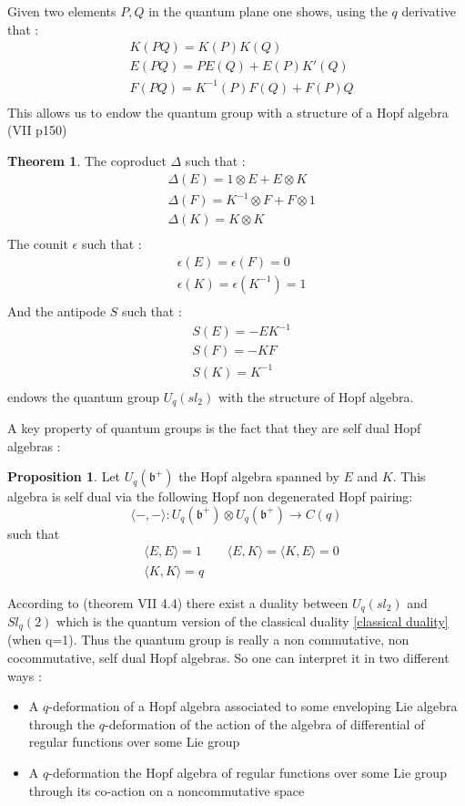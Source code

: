 \documentclass{article}
\theoremstyle{definition}
\newtheorem{theo}{Theorem}[section]
\newtheorem{Prop}{Proposition}[section]
\begin{document}
Given two elements $P,Q$ in the quantum plane one shows, using the $q$ derivative that : \begin{align}
&K(PQ)=K(P)K(Q)\\
&E(PQ)=PE(Q)+E(P)K'(Q)\\
&F(PQ)=K^{-1}(P)F(Q)+F(P)Q\\
\end{align}
This allows us to endow the quantum group with a structure of a Hopf algebra\cite{Kassel} (VII p150)
\begin{theo} The coproduct $\Delta$ such that :\begin{align*}
&\Delta(E)=1\otimes E+E\otimes K\\
&\Delta(F)=K^{-1}\otimes F+F\otimes 1\\
&\Delta(K)=K\otimes K\\
\end{align*}
The counit $\epsilon$ such that :\begin{align*}
&\epsilon(E)=\epsilon(F)=0\\
&\epsilon(K)=\epsilon(K^{-1})=1\\
\end{align*}
And the antipode $S$ such that : \begin{align*}
&S(E)=-EK^{-1}\\
&S(F)=-KF\\
&S(K)=K^{-1}\\
\end{align*}
endows the quantum group $U_q(sl_2)$ with the structure of Hopf algebra.
\end{theo}
A key property of quantum groups is the fact that they are self dual Hopf algebras : \begin{Prop}Let $U_q(\mathfrak{b}^+)$ the Hopf algebra spanned by $E$ and $K$. This algebra is self dual  via the following Hopf non degenerated Hopf pairing: $$\langle-,-\rangle : U_q(\mathfrak{b}^+)\otimes U_q(\mathfrak{b}^+)\to C(q)$$ such that \begin{align*}
&\langle E,E\rangle = 1\qquad \langle E, K\rangle =\langle K,E\rangle =0 \\
&\langle K,K\rangle = q
\end{align*}
\end{Prop}
According to \cite{Kassel} (theorem VII 4.4) there exist a duality between $U_q(sl_2)$ and $Sl_q(2)$ which is the quantum version of the classical duality \ref{classical duality} (when q=1). Thus the quantum group is really a non commutative, non cocommutative, self dual Hopf algebras. So one can interpret it in two different ways : \begin{itemize}
\item A $q$-deformation of a Hopf algebra associated to some enveloping Lie algebra through the $q$-deformation of the action of the algebra of differential of regular functions over some Lie group
\item A $q$-deformation the Hopf algebra of regular functions over some Lie group through its co-action on a noncommutative space
\end{itemize} 
\end{document}
